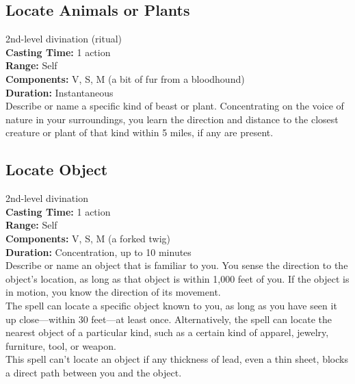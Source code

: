\documentclass[11pt, A4paper, english]{article}
\begin{document}
		\subsection{Locate Animals or Plants}
2nd-level divination (ritual) \\
\textbf{Casting Time:} 1 action \\
\textbf{Range:} Self \\
\textbf{Components:} V, S, M (a bit of fur from a bloodhound) \\
\textbf{Duration:} Instantaneous \\
Describe or name a specific kind of beast or plant. Concentrating on the voice of nature in your surroundings, you learn the direction and distance to the closest creature or plant of that kind within 5 miles, if any are present.

		\subsection{Locate Object}
2nd-level divination \\
\textbf{Casting Time:} 1 action \\
\textbf{Range:} Self \\
\textbf{Components:} V, S, M (a forked twig) \\
\textbf{Duration:} Concentration, up to 10 minutes \\
Describe or name an object that is familiar to you. You sense the direction to the object’s location, as long as that object is within 1,000 feet of you. If the object is in motion, you know the direction of its movement. \\
The spell can locate a specific object known to you, as long as you have seen it up close—within 30 feet—at least once. Alternatively, the spell can locate the nearest object of a particular kind, such as a certain kind of apparel, jewelry, furniture, tool, or weapon. \\
This spell can’t locate an object if any thickness of lead, even a thin sheet, blocks a direct path between you and the object.
\end{document}
